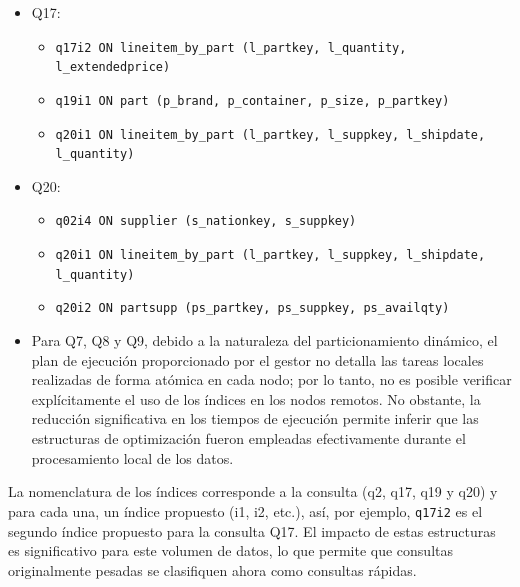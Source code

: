 \documentclass[12pt, letter paper]{report}
\begin{document}
        \begin{itemize}
          \item Q17:
          \begin{itemize}
            \item \texttt{q17i2 ON lineitem\_by\_part (l\_partkey, l\_quantity,
                                                              l\_extendedprice)}
            \item \texttt{q19i1 ON part (p\_brand, p\_container, p\_size,
                                                                    p\_partkey)}
            \item \texttt{q20i1 ON lineitem\_by\_part (l\_partkey, l\_suppkey,
                                                      l\_shipdate, l\_quantity)}
          \end{itemize}
          \item Q20:
          \begin{itemize}
            \item \texttt{q02i4 ON supplier (s\_nationkey, s\_suppkey)}
            \item \texttt{q20i1 ON lineitem\_by\_part (l\_partkey, l\_suppkey,
                                                      l\_shipdate, l\_quantity)}
            \item \texttt{q20i2 ON partsupp (ps\_partkey, ps\_suppkey,
                                                                  ps\_availqty)}
          \end{itemize}
          \item Para Q7, Q8 y Q9, debido a la naturaleza del particionamiento
          dinámico, el plan de ejecución proporcionado por el gestor no detalla
          las tareas locales realizadas de forma atómica en cada nodo; por lo
          tanto, no es posible verificar explícitamente el uso de los índices en
          los nodos remotos. No obstante, la reducción significativa en los
          tiempos de ejecución permite inferir que las estructuras de
          optimización fueron empleadas efectivamente durante el procesamiento
          local de los datos.
        \end{itemize}

        La nomenclatura de los índices corresponde a la consulta (q2, q17, q19 y
        q20) y para cada una, un índice propuesto (i1, i2, etc.), así, por
        ejemplo, \texttt{q17i2} es el segundo índice propuesto para la consulta
        Q17. El impacto de estas estructuras es significativo para este volumen
        de datos, lo que permite que consultas originalmente pesadas se
        clasifiquen ahora como consultas rápidas.
\end{document}
